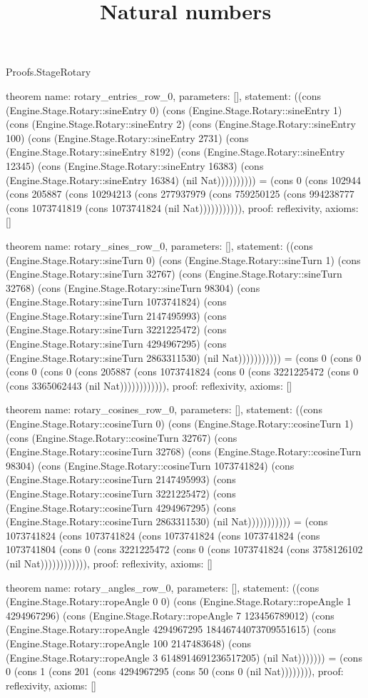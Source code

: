 \begin{lexlean}{Proofs.StageRotary}
\title{Natural numbers}
\begin{semanticmodule}
theorem{
  name: rotary_entries_row_0,
  parameters: [],
  statement: ((cons (Engine.Stage.Rotary::sineEntry 0) (cons (Engine.Stage.Rotary::sineEntry 1) (cons (Engine.Stage.Rotary::sineEntry 2) (cons (Engine.Stage.Rotary::sineEntry 100) (cons (Engine.Stage.Rotary::sineEntry 2731) (cons (Engine.Stage.Rotary::sineEntry 8192) (cons (Engine.Stage.Rotary::sineEntry 12345) (cons (Engine.Stage.Rotary::sineEntry 16383) (cons (Engine.Stage.Rotary::sineEntry 16384) (nil Nat)))))))))) = (cons 0 (cons 102944 (cons 205887 (cons 10294213 (cons 277937979 (cons 759250125 (cons 994238777 (cons 1073741819 (cons 1073741824 (nil Nat))))))))))),
  proof: reflexivity{},
  axioms: []
}

theorem{
  name: rotary_sines_row_0,
  parameters: [],
  statement: ((cons (Engine.Stage.Rotary::sineTurn 0) (cons (Engine.Stage.Rotary::sineTurn 1) (cons (Engine.Stage.Rotary::sineTurn 32767) (cons (Engine.Stage.Rotary::sineTurn 32768) (cons (Engine.Stage.Rotary::sineTurn 98304) (cons (Engine.Stage.Rotary::sineTurn 1073741824) (cons (Engine.Stage.Rotary::sineTurn 2147495993) (cons (Engine.Stage.Rotary::sineTurn 3221225472) (cons (Engine.Stage.Rotary::sineTurn 4294967295) (cons (Engine.Stage.Rotary::sineTurn 2863311530) (nil Nat))))))))))) = (cons 0 (cons 0 (cons 0 (cons 0 (cons 205887 (cons 1073741824 (cons 0 (cons 3221225472 (cons 0 (cons 3365062443 (nil Nat)))))))))))),
  proof: reflexivity{},
  axioms: []
}

theorem{
  name: rotary_cosines_row_0,
  parameters: [],
  statement: ((cons (Engine.Stage.Rotary::cosineTurn 0) (cons (Engine.Stage.Rotary::cosineTurn 1) (cons (Engine.Stage.Rotary::cosineTurn 32767) (cons (Engine.Stage.Rotary::cosineTurn 32768) (cons (Engine.Stage.Rotary::cosineTurn 98304) (cons (Engine.Stage.Rotary::cosineTurn 1073741824) (cons (Engine.Stage.Rotary::cosineTurn 2147495993) (cons (Engine.Stage.Rotary::cosineTurn 3221225472) (cons (Engine.Stage.Rotary::cosineTurn 4294967295) (cons (Engine.Stage.Rotary::cosineTurn 2863311530) (nil Nat))))))))))) = (cons 1073741824 (cons 1073741824 (cons 1073741824 (cons 1073741824 (cons 1073741804 (cons 0 (cons 3221225472 (cons 0 (cons 1073741824 (cons 3758126102 (nil Nat)))))))))))),
  proof: reflexivity{},
  axioms: []
}

theorem{
  name: rotary_angles_row_0,
  parameters: [],
  statement: ((cons (Engine.Stage.Rotary::ropeAngle 0 0) (cons (Engine.Stage.Rotary::ropeAngle 1 4294967296) (cons (Engine.Stage.Rotary::ropeAngle 7 123456789012) (cons (Engine.Stage.Rotary::ropeAngle 4294967295 18446744073709551615) (cons (Engine.Stage.Rotary::ropeAngle 100 2147483648) (cons (Engine.Stage.Rotary::ropeAngle 3 6148914691236517205) (nil Nat))))))) = (cons 0 (cons 1 (cons 201 (cons 4294967295 (cons 50 (cons 0 (nil Nat)))))))),
  proof: reflexivity{},
  axioms: []
}
\end{semanticmodule}
\end{lexlean}
